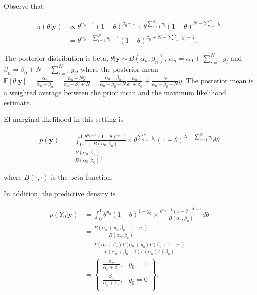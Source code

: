 \begin{enumerate}
Observe that

\begin{align}
	\pi(\theta|\mathbf{y})&\propto \theta^{\alpha_0-1}(1-\theta)^{\beta_0-1} \times \theta^{\sum_{i=1}^N y_i}(1-\theta)^{N-\sum_{i=1}^Ny_i}\nonumber\\
	&= \theta^{\alpha_0+\sum_{i=1}^N y_i-1}(1-\theta)^{\beta_0+N-\sum_{i=1}^Ny_i-1}.\nonumber 
\end{align}

The posterior distribution is beta, $\theta|\mathbf{y}\sim B(\alpha_n,\beta_n)$, $\alpha_n=\alpha_0+\sum_{i=1}^N y_i$ and $\beta_n=\beta_0+N-\sum_{i=1}^Ny_i$, where the posterior mean $\mathbb{E}[\theta|\mathbf{y}]=\frac{\alpha_n}{\alpha_n+\beta_n}=\frac{\alpha_0+N\bar{y}}{\alpha_0+\beta_0+N}=\frac{\alpha_0+\beta_0}{\alpha_0+\beta_0+N}\frac{\alpha_0}{\alpha_0+\beta_0}+\frac{N}{\alpha_0+\beta_0+N}\bar{y}$. The posterior mean is a weighted average between the prior mean and the maximum likelihood estimate.

El marginal likelihood in this setting is

\begin{align}
	p(\mathbf{y})=&\int_{0}^1 \frac{\theta^{\alpha_0-1}(1-\theta)^{\beta_0-1}}{B(\alpha_0,\beta_0)}\times \theta^{\sum_{i=1}^N y_i}(1-\theta)^{N-\sum_{i=1}^N y_i}d\theta\nonumber\\
	=& \frac{B(\alpha_n,\beta_n)}{B(\alpha_0,\beta_0)},\nonumber
\end{align}

where $B(\cdot ,\cdot)$ is the beta function.

In addition, the predictive density is

\begin{align}
	p(Y_0|\mathbf{y})&=\int_0^1 \theta^{y_0}(1-\theta)^{1-y_0}\times \frac{\theta^{\alpha_n-1}(1-\theta)^{\beta_n-1}}{B(\alpha_n,\beta_n)}d\theta\nonumber\\
	&=\frac{B(\alpha_n+y_0,\beta_n+1-y_0)}{B(\alpha_n,\beta_n)}\nonumber\\
	&=\frac{\Gamma(\alpha_n+\beta_n)\Gamma(\alpha_n+y_0)\Gamma(\beta_n+1-y_0)}{\Gamma(\alpha_n+\beta_n+1)\Gamma(\alpha_n)\Gamma(\beta_n)}\nonumber\\
	&=\begin{Bmatrix}
		\frac{\alpha_n}{\alpha_n+\beta_n}, & y_0=1\\
		\frac{\beta_n}{\alpha_n+\beta_n}, & y_0=0\\
	\end{Bmatrix}.\nonumber
\end{align}


\end{enumerate}
